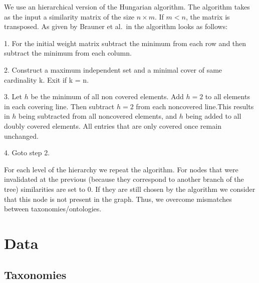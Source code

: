 \documentclass[11pt,a4paper]{article}
\begin{document}
We use an hierarchical version of the Hungarian algorithm. The algorithm takes as the input a similarity matrix of the size $n \times m$. If $m < n$, the matrix is transposed. As given by Brauner et al.\ in \citeyear{hungarian-listing} the algorithm looks as follows:

1. For the initial weight matrix subtract the minimum from each row and then subtract the minimum from each column.

2. Construct a maximum independent set and a minimal cover of same cardinality k. Exit if k = n.

3. Let $h$ be the minimum of all non covered elements. Add $h=2$ to all elements in each covering line. Then subtract $h=2$ from each noncovered line.This results in $h$ being subtracted from all noncovered elements, and $h$ being added to all doubly covered elements. All entries that are only covered once remain unchanged.

4. Goto step 2.

For each level of the hierarchy we repeat the algorithm. For nodes that were invalidated at the previous (because they correspond to another branch of the tree) similarities are set to 0. If they are still chosen by the algorithm we consider that this node is not present in the graph. Thus, we overcome mismatches between taxonomies/ontologies.
%

\section{Data}
\subsection{Taxonomies}
\end{document}
